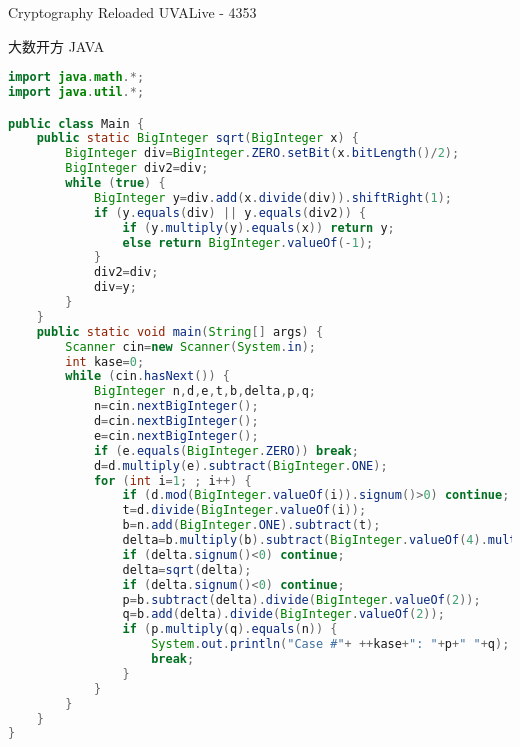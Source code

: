 Cryptography Reloaded UVALive - 4353

大数开方 JAVA

\begin{lstlisting}[language={java}]
import java.math.*;
import java.util.*;

public class Main {
    public static BigInteger sqrt(BigInteger x) {
        BigInteger div=BigInteger.ZERO.setBit(x.bitLength()/2);
        BigInteger div2=div;
        while (true) {
            BigInteger y=div.add(x.divide(div)).shiftRight(1);
            if (y.equals(div) || y.equals(div2)) {
                if (y.multiply(y).equals(x)) return y;
                else return BigInteger.valueOf(-1);
            }
            div2=div;
            div=y;
        }
    }
    public static void main(String[] args) {
        Scanner cin=new Scanner(System.in);
        int kase=0;
        while (cin.hasNext()) {
            BigInteger n,d,e,t,b,delta,p,q;
            n=cin.nextBigInteger();
            d=cin.nextBigInteger();
            e=cin.nextBigInteger();
            if (e.equals(BigInteger.ZERO)) break;
            d=d.multiply(e).subtract(BigInteger.ONE);
            for (int i=1; ; i++) {
                if (d.mod(BigInteger.valueOf(i)).signum()>0) continue;
                t=d.divide(BigInteger.valueOf(i));
                b=n.add(BigInteger.ONE).subtract(t);
                delta=b.multiply(b).subtract(BigInteger.valueOf(4).multiply(n));
                if (delta.signum()<0) continue;
                delta=sqrt(delta);
                if (delta.signum()<0) continue;
                p=b.subtract(delta).divide(BigInteger.valueOf(2));
                q=b.add(delta).divide(BigInteger.valueOf(2));
                if (p.multiply(q).equals(n)) {
                    System.out.println("Case #"+ ++kase+": "+p+" "+q);
                    break;
                }
            }
        }
    }
}
\end{lstlisting}